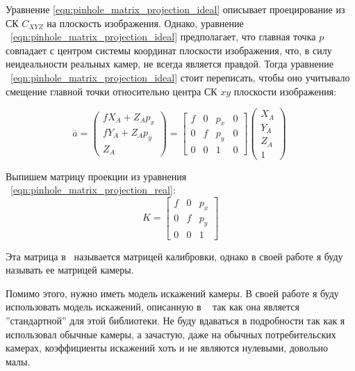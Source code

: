 \documentclass[12pt, a4paper]{article}
\begin{document}
\par

Уравнение \eqref{eqn:pinhole_matrix_projection_ideal} описывает проецирование из
СК $C_{XYZ}$ на плоскость изображения.  Однако, уравнение
~\eqref{eqn:pinhole_matrix_projection_ideal} предполагает, что главная точка $p$
совпадает с центром системы координат плоскости изображения, что, в силу
неидеальности реальных камер, не всегда является правдой. Тогда уравнение
~\eqref{eqn:pinhole_matrix_projection_ideal} стоит переписать, чтобы оно
учитывало смещение главной точки относительно центра СК $xy$ плоскости
изображения:
    
\begin{equation}
    \overline{a} = \begin{pmatrix}
        fX_A + Z_A p_x\\
        fY_A + Z_A p_y\\
        Z_A
    \end{pmatrix} = \begin{bmatrix}
        f & 0 & p_x & 0 \\
        0 & f & p_y & 0 \\
        0 & 0 & 1 & 0
    \end{bmatrix} \begin{pmatrix}
        X_A\\
        Y_A\\
        Z_A\\
        1
    \end{pmatrix}
~\label{eqn:pinhole_matrix_projection_real}
\end{equation}

Выпишем матрицу проекции из уравнения ~\eqref{eqn:pinhole_matrix_projection_real}:
\begin{equation}
    K = \begin{bmatrix}
        f & 0 & p_x\\
        0 & f & p_y\\
        0 & 0 & 1
    \end{bmatrix}
\end{equation}

Эта матрица в~\cite{multiview_cv} называется матрицей калибровки, однако в своей
работе я буду называть ее матрицей камеры. 

Помимо этого, нужно иметь модель искажений камеры.
В своей работе я буду использовать модель искажений, описанную в
~\cite{opencv_calibration_tutorial} так как она является ''стандартной'' для этой
библиотеки.  Не буду вдаваться в подробности так как я использовал обычные
камеры, а зачастую, даже на обычных потребительских камерах, коэффициенты
искажений хоть и не являются нулевыми, довольно малы.
\end{document}
